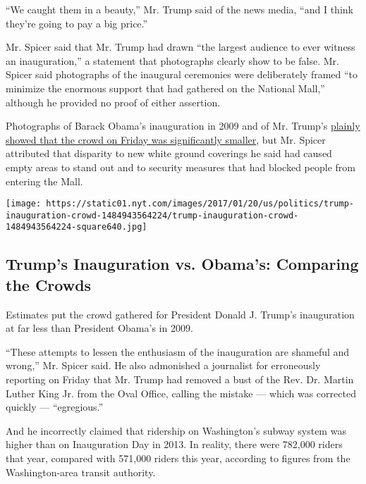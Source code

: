 ``We caught them in a beauty,'' Mr. Trump said of the news media, ``and
I think they're going to pay a big price.''

Mr. Spicer said that Mr. Trump had drawn ``the largest audience to ever
witness an inauguration,'' a statement that photographs clearly show to
be false. Mr. Spicer said photographs of the inaugural ceremonies were
deliberately framed ``to minimize the enormous support that had gathered
on the National Mall,'' although he provided no proof of either
assertion.

Photographs of Barack Obama's inauguration in 2009 and of Mr. Trump's
\href{https://www.nytimes.com/interactive/2017/01/20/us/politics/trump-inauguration-crowd.html}{plainly
showed that the crowd on Friday was significantly smaller}, but Mr.
Spicer attributed that disparity to new white ground coverings he said
had caused empty areas to stand out and to security measures that had
blocked people from entering the Mall.

\href{https://www.nytimes.com/interactive/2017/01/20/us/politics/trump-inauguration-crowd.html}{}

\texttt{[image: https://static01.nyt.com/images/2017/01/20/us/politics/trump-inauguration-crowd-1484943564224/trump-inauguration-crowd-1484943564224-square640.jpg]}

\hypertarget{trumps-inauguration-vs-obamas-comparing-the-crowds}{%
\subsection{Trump's Inauguration vs. Obama's: Comparing the
Crowds}\label{trumps-inauguration-vs-obamas-comparing-the-crowds}}

Estimates put the crowd gathered for President Donald J. Trump's
inauguration at far less than President Obama's in 2009.

``These attempts to lessen the enthusiasm of the inauguration are
shameful and wrong,'' Mr. Spicer said. He also admonished a journalist
for erroneously reporting on Friday that Mr. Trump had removed a bust of
the Rev. Dr. Martin Luther King Jr. from the Oval Office, calling the
mistake --- which was corrected quickly --- ``egregious.''

And he incorrectly claimed that ridership on Washington's subway system
was higher than on Inauguration Day in 2013. In reality, there were
782,000 riders that year, compared with 571,000 riders this year,
according to figures from the Washington-area transit authority.


